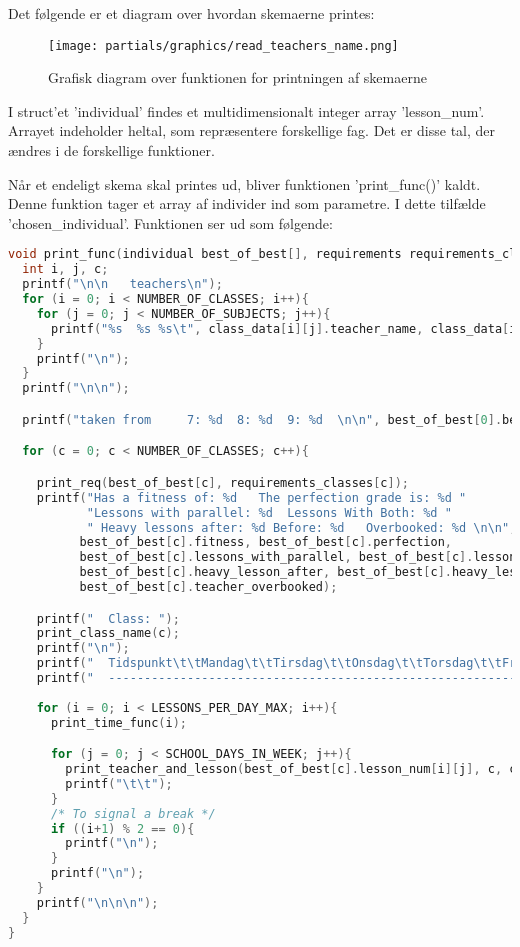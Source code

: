 Det følgende er et diagram over hvordan skemaerne printes:
\begin{figure}[!h]
\texttt{[image: partials/graphics/read\_teachers\_name.png]}
\caption{Grafisk diagram over funktionen for printningen af skemaerne}
\label{fig:diagramprint}
\end{figure}

I struct’et ’individual’ findes et multidimensionalt integer array ’lesson\_num’. Arrayet indeholder heltal, som repræsentere forskellige fag. Det er disse tal, der ændres i de forskellige funktioner. 

Når et endeligt skema skal printes ud, bliver funktionen ’print\_func()’ kaldt. Denne funktion tager et array af individer ind som parametre. I dette tilfælde ’chosen\_individual’. Funktionen ser ud som følgende:
\begin{lstlisting}[language = C]
void print_func(individual best_of_best[], requirements requirements_classes[], class_info **class_data){
  int i, j, c;
  printf("\n\n   teachers\n");
  for (i = 0; i < NUMBER_OF_CLASSES; i++){
    for (j = 0; j < NUMBER_OF_SUBJECTS; j++){
      printf("%s  %s %s\t", class_data[i][j].teacher_name, class_data[i][j].lesson_name, class_data[i][j].class_name);
    }
    printf("\n");
  }
  printf("\n\n");

  printf("taken from     7: %d  8: %d  9: %d  \n\n", best_of_best[0].best_gena7, best_of_best[0].best_gena8, best_of_best[0].best_gena9);

  for (c = 0; c < NUMBER_OF_CLASSES; c++){

    print_req(best_of_best[c], requirements_classes[c]);
    printf("Has a fitness of: %d   The perfection grade is: %d "
           "Lessons with parallel: %d  Lessons With Both: %d " 
           " Heavy lessons after: %d Before: %d   Overbooked: %d \n\n", 
          best_of_best[c].fitness, best_of_best[c].perfection, 
          best_of_best[c].lessons_with_parallel, best_of_best[c].lessons_with_both, 
          best_of_best[c].heavy_lesson_after, best_of_best[c].heavy_lesson_before, 
          best_of_best[c].teacher_overbooked);

    printf("  Class: ");
    print_class_name(c);
    printf("\n");
    printf("  Tidspunkt\t\tMandag\t\tTirsdag\t\tOnsdag\t\tTorsdag\t\tFredag\n");
    printf("  ------------------------------------------------------------------------------------------------\n");
    
    for (i = 0; i < LESSONS_PER_DAY_MAX; i++){
      print_time_func(i);

      for (j = 0; j < SCHOOL_DAYS_IN_WEEK; j++){
        print_teacher_and_lesson(best_of_best[c].lesson_num[i][j], c, class_data);
        printf("\t\t");
      }
      /* To signal a break */
      if ((i+1) % 2 == 0){
        printf("\n");
      }
      printf("\n");
    }
    printf("\n\n\n");
  }
}
\end{lstlisting}

